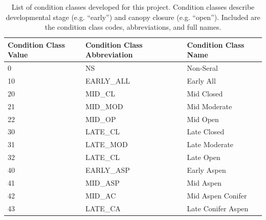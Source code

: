 
\begin{table}[!htbp]
\caption{List of condition classes developed for this project. Condition classes describe developmental stage (e.g. ``early'') and canopy closure (e.g. ``open''). Included are the condition class codes, abbreviations, and full names.}
\label{condtable}
\begin{tabular}{@{}lll@{}}
\toprule
\textbf{Condition Class Value} & \textbf{Condition Class Abbreviation} & \textbf{Condition Class Name} \\ \midrule
\rowcolor[HTML]{CAD6BA} 
0                              & NS                                    & Non-Seral                     \\
10                             & EARLY\_ALL                            & Early All                     \\
\rowcolor[HTML]{CAD6BA} 
20                             & MID\_CL                               & Mid Closed                    \\
21                             & MID\_MOD                              & Mid Moderate                  \\
\rowcolor[HTML]{CAD6BA} 
22                             & MID\_OP                               & Mid Open                      \\
30                             & LATE\_CL                              & Late Closed                   \\
\rowcolor[HTML]{CAD6BA} 
31                             & LATE\_MOD                             & Late Moderate                 \\
32                             & LATE\_CL                              & Late Open                     \\
\rowcolor[HTML]{CAD6BA} 
40                             & EARLY\_ASP                            & Early Aspen                   \\
41                             & MID\_ASP                              & Mid Aspen                     \\
\rowcolor[HTML]{CAD6BA} 
42                             & MID\_AC                               & Mid Aspen Conifer             \\
43                             & LATE\_CA                              & Late Conifer Aspen            \\ \bottomrule
\end{tabular}
\end{table}

